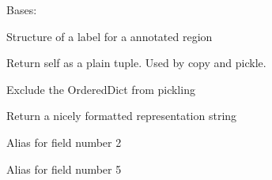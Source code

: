 \documentclass[letterpaper,10pt,english]{sphinxmanual}
\begin{document}
\begin{fulllineitems}
\label{api/ClearMap.Analysis:ClearMap.Analysis.Label.LabelRecord}
Bases: 

Structure of a label for a annotated region

\begin{fulllineitems}
\label{api/ClearMap.Analysis:ClearMap.Analysis.Label.LabelRecord.__getnewargs__}
Return self as a plain tuple.  Used by copy and pickle.

\end{fulllineitems}


\begin{fulllineitems}
\label{api/ClearMap.Analysis:ClearMap.Analysis.Label.LabelRecord.__getstate__}
Exclude the OrderedDict from pickling

\end{fulllineitems}


\begin{fulllineitems}
\label{api/ClearMap.Analysis:ClearMap.Analysis.Label.LabelRecord.__repr__}
Return a nicely formatted representation string

\end{fulllineitems}


\begin{fulllineitems}
\label{api/ClearMap.Analysis:ClearMap.Analysis.Label.LabelRecord.acronym}
Alias for field number 2

\end{fulllineitems}


\begin{fulllineitems}
\label{api/ClearMap.Analysis:ClearMap.Analysis.Label.LabelRecord.collapse}
Alias for field number 5


\end{fulllineitems}
\end{fulllineitems}
\end{document}
